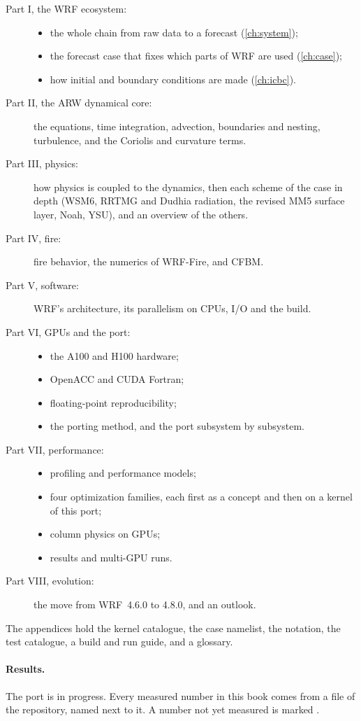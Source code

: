 \begin{description}
  \item[Part I, the WRF ecosystem:]
    \begin{itemize}
      \item the whole chain from raw data to a forecast (\cref{ch:system});
      \item the forecast case that fixes which parts of WRF are used (\cref{ch:case});
      \item how initial and boundary conditions are made (\cref{ch:icbc}).
    \end{itemize}
  \item[Part II, the ARW dynamical core:] the equations, time integration, advection, boundaries and nesting,
    turbulence, and the Coriolis and curvature terms.
  \item[Part III, physics:] how physics is coupled to the dynamics, then each scheme of the case in depth (WSM6,
    RRTMG and Dudhia radiation, the revised MM5 surface layer, Noah, YSU), and an overview of the others.
  \item[Part IV, fire:] fire behavior, the numerics of WRF-Fire, and CFBM.
  \item[Part V, software:] WRF's architecture, its parallelism on CPUs, I/O and the build.
  \item[Part VI, GPUs and the port:]
    \begin{itemize}
      \item the A100 and H100 hardware;
      \item OpenACC and CUDA Fortran;
      \item floating-point reproducibility;
      \item the porting method, and the port subsystem by subsystem.
    \end{itemize}
  \item[Part VII, performance:]
    \begin{itemize}
      \item profiling and performance models;
      \item four optimization families, each first as a concept and then on a kernel of this port;
      \item column physics on GPUs;
      \item results and multi-GPU runs.
    \end{itemize}
  \item[Part VIII, evolution:] the move from WRF~4.6.0 to 4.8.0, and an outlook.
\end{description}
The appendices hold the kernel catalogue, the case namelist, the notation, the test catalogue, a build and run
guide, and a glossary.

\paragraph{Results.} The port is in progress. Every measured number in this book comes from a file of the
repository, named next to it. A number not yet measured is marked \tbr.
